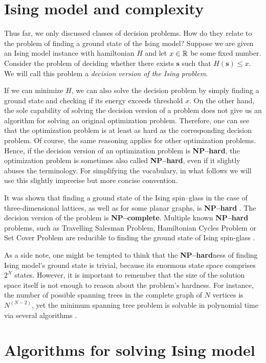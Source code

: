 \section{Ising model and complexity}

Thus far, we only discussed classes of decision problems. How do they relate to
the problem of finding a ground state of the Ising model? Suppose we are given
an Ising model instance with hamiltonian $H$ and let $x \in \mathbb{R}$ be some fixed
number. Consider the problem of deciding whether there exists $\mathbf{s}$ such
that $H(\mathbf{s}) \le x$. We will call this problem a \emph{decision version
  of the Ising problem}.

If we can minimize $H$, we can also solve the decision problem by simply
finding a ground state and checking if its energy exceeds threshold $x$. On the
other hand, the sole capability of solving the decision version of a problem
does not give us an algorithm for solving an original optimization problem.
Therefore, one can see that the optimization problem is at least as hard as the
corresponding decision problem. Of course, the same reasoning applies for other
optimization problems. Hence, if the decision version of an optimization
problem is \textbf{NP--hard}, the optimization problem is sometimes also called
\textbf{NP--hard}, even if it slightly abuses the terminology. For simplifying
the vocabulary, in what follows we will use this slightly imprecise but more
concise convention.

It was shown that finding a ground state of the Ising spin--glass in the case
of three-dimensional lattices, as well as for some planar graphs, is
\textbf{NP--hard} \cite{barahoma}. The decision version of the problem is
\textbf{NP--complete}. Multiple known \textbf{NP--hard} problems, such as
Travelling Salesman Problem, Hamiltonian Cycles Problem or Set Cover Problem
are reducible to finding the ground state of Ising spin-glass \cite{lucas}.

As a side note, one might be tempted to think that the \textbf{NP--hard}ness of
finding Ising model's ground state is trivial, because its enormous state space
comprises $2^{N}$ states. However, it is important to remember that the size of
the solution space itself is not enough to reason about the problem's hardness.
For instance, the number of possible spanning trees in the complete graph of
$N$ vertices is $N^{(N-2)}$, yet the minimum spanning tree problem is solvable
in polynomial time via several algorithms \cite{clrs}.

\section{Algorithms for solving Ising model}

